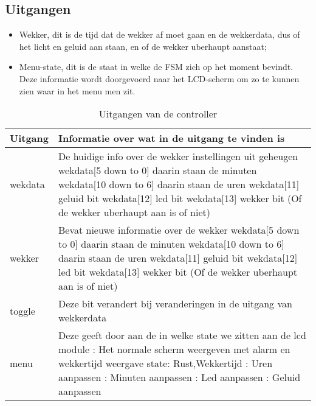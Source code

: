\subsection{Uitgangen}
\begin{itemize}[nolistsep]
\item Wekker, dit is de tijd dat de wekker af moet gaan en de wekkerdata, dus of het licht en geluid aan staan, en of de wekker uberhaupt aanstaat;
\item Menu-state, dit is de staat in welke de FSM zich op het moment bevindt. Deze informatie wordt doorgevoerd naar het LCD-scherm om zo te kunnen zien waar in het menu men zit.\\
\end{itemize}
\begin{table}
\begin{tabular}{|l|p{10cm}|}
\hline
Uitgang & Informatie over wat in de uitgang te vinden is \\ \hline
wekdata & De huidige info over de wekker instellingen uit geheugen \newline
wekdata[5 down to 0] daarin staan de minuten \newline
wekdata[10 down to 6] daarin staan de uren \newline
wekdata[11] geluid bit \newline
wekdata[12] led bit \newline
wekdata[13] wekker bit (Of de wekker uberhaupt aan is of niet) \\ \hline
wekker & Bevat nieuwe informatie over de wekker \newline
wekdata[5 down to 0] daarin staan de minuten \newline
wekdata[10 down to 6] daarin staan de uren \newline
wekdata[11] geluid bit \newline
wekdata[12] led bit \newline
wekdata[13] wekker bit (Of de wekker uberhaupt aan is of niet) \\ \hline
toggle & Deze bit verandert bij veranderingen in de uitgang van wekkerdata \\ \hline
menu & Deze geeft door aan de in welke state we zitten aan de lcd module \newline
000 : Het normale scherm weergeven met alarm en wekkertijd weergave state: Rust,Wekkertijd \newline
001 : Uren aanpassen \newline
010 : Minuten aanpassen \newline
011 : Led aanpassen \newline
100 : Geluid aanpassen \\ \hline
\end{tabular}
\caption{Uitgangen van de controller}
\label{tab:uitgangen_controller}
\end{table}

